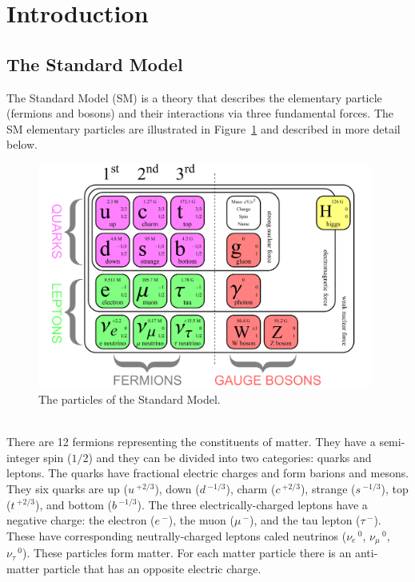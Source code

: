 \section{Introduction}
\label{sec:Introduction}

\subsection{The Standard Model}
\label{sec:StandardModel}

The Standard Model (SM) is a theory that describes the elementary particle (fermions and bosons) and their interactions via three fundamental forces. The SM elementary particles are illustrated in Figure~\ref{fig:SMParticles} and described in more detail below.

\begin{figure}[h]
  \centering
  \includegraphics[width=0.98\textwidth]{./plots/SM.png}
  \caption{The particles of the Standard Model.}
  \label{fig:SMParticles}
\end{figure}

\ \\There are 12 fermions representing the constituents of matter. They have a semi-integer spin ($1/2$) and they can be divided into two categories: quarks and leptons. The quarks have fractional electric charges and form barions and mesons. They six quarks are up ($u\,^{+2/3}$), down ($d\,^{-1/3}$), charm ($c\,^{+2/3}$), strange ($s\,^{-1/3}$), top ($t\,^{+2/3}$), and bottom ($b\,^{-1/3}$). The three electrically-charged leptons have a negative charge: the electron ($e\,^{-}$), the muon ($\mu\,^{-}$), and the tau lepton ($\tau\,^{-}$). These have corresponding neutrally-charged leptons caled neutrinos ($\nu_e\,^0$, $\nu_\mu\,^0$, $\nu_\tau\,^0$). These particles form matter. For each matter particle there is an anti-matter particle that has an opposite electric charge. 

